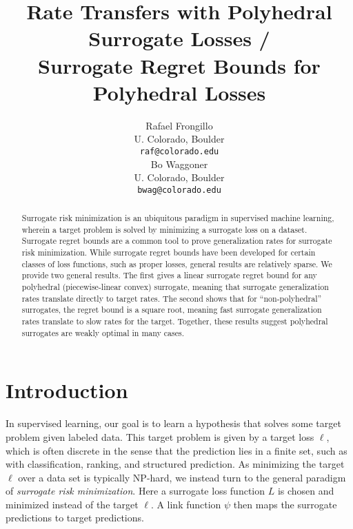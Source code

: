 \documentclass{article}
\title{Rate Transfers with Polyhedral Surrogate Losses /\\
  Surrogate Regret Bounds for Polyhedral Losses}
\author{%
  Rafael Frongillo \\
  U. Colorado, Boulder \\
  \texttt{raf@colorado.edu} \\
  \And
  Bo Waggoner \\
  U. Colorado, Boulder \\
  \texttt{bwag@colorado.edu}
}
\begin{document}
\maketitle

\begin{abstract}
  Surrogate risk minimization is an ubiquitous paradigm in supervised machine learning, wherein a target problem is solved by minimizing a surrogate loss on a dataset.
  Surrogate regret bounds are a common tool to prove generalization rates for surrogate risk minimization.
  While surrogate regret bounds have been developed for certain classes of loss functions, such as proper losses, general results are relatively sparse.
  We provide two general results.
  The first gives a linear surrogate regret bound for any polyhedral (piecewise-linear convex) surrogate, meaning that surrogate generalization rates translate directly to target rates.
  The second shows that for ``non-polyhedral'' surrogates, the regret bound is a square root, meaning fast surrogate generalization rates translate to slow rates for the target.
  Together, these results suggest polyhedral surrogates are weakly optimal in many cases.
\end{abstract}




\section{Introduction}
In supervised learning, our goal is to learn a hypothesis that solves some target problem given labeled data.
This target problem is given by a target loss $\ell$, which is often discrete in the sense that the prediction lies in a finite set, such as with classification, ranking, and structured prediction.
As minimizing the target $\ell$ over a data set is typically NP-hard, we instead turn to the general paradigm of \emph{surrogate risk minimization}.
Here a surrogate loss function $L$ is chosen and minimized instead of the target $\ell$.
A link function $\psi$ then maps the surrogate predictions to target predictions.
\end{document}
